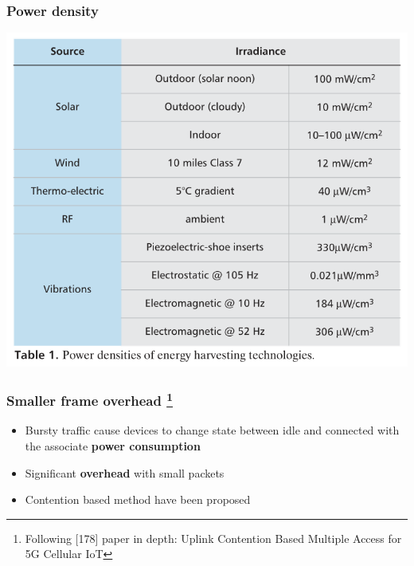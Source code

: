 \documentclass[a4paper,11pt,handout]{beamer}
\begin{document}
\begin{frame}
\frametitle{Power density}
	\begin{center}
	\includegraphics[width=.8\textwidth]{power-density.png}
	\end{center}

\end{frame}
\begin{frame}
	\frametitle{Smaller frame overhead %
		\footnote{Following [178] paper in depth: Uplink Contention Based Multiple 
		Access for 5G Cellular IoT}%
	}

	\begin{itemize}
		\item Bursty traffic cause devices to change state between idle and 
		connected with the associate \textbf{power consumption}
		\item Significant \textbf{overhead} with small packets
		\item Contention based method have been proposed
		\end{itemize}
\end{frame}
\end{document}
